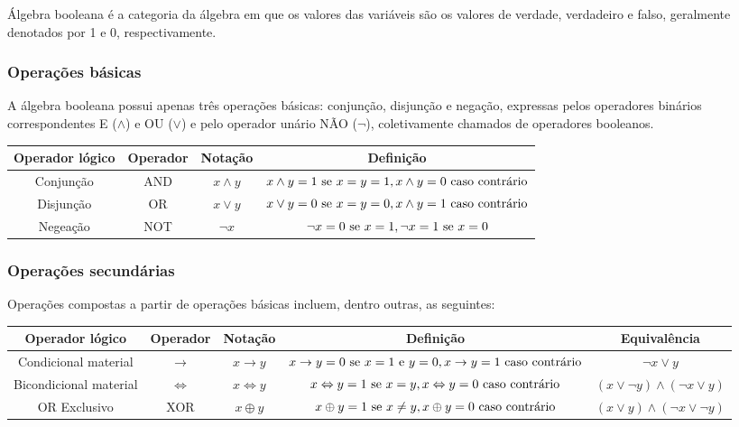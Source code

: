 Álgebra booleana é a categoria da álgebra em que os valores das variáveis são os valores de verdade, verdadeiro e falso, geralmente denotados por 1 e 0, respectivamente.

\subsubsection{Operações básicas}
A álgebra booleana possui apenas três operações básicas: conjunção, disjunção e negação, expressas pelos operadores binários correspondentes E ($\land$) e OU ($\lor$) e pelo operador unário NÃO ($\neg$), coletivamente chamados de operadores booleanos.

\begin{center}
    \begin{tabular}{c|c|c|c}
        Operador lógico & Operador & Notação & Definição\\
        \hline
        Conjunção & AND & $x \land y$  & $x \land y = 1 \textnormal{ se } x=y=1,x \land y = 0 \textnormal{ caso contrário}$ \\
        Disjunção & OR & $x \lor y$ & $x \lor y = 0 \textnormal{ se } x=y=0,x \land y = 1 \textnormal{ caso contrário}$  \\
        Negeação & NOT & $\neg x$ & $\neg x = 0 \textnormal{ se } x=1,\neg x  = 1 \textnormal{ se }x=0$ 
    \end{tabular}
    
\end{center}

\subsubsection{Operações secundárias}
Operações compostas a partir de operações básicas incluem, dentro outras, as seguintes:
\begin{center}
    \begin{tabular}{c|c|c|c|c}
        Operador lógico & Operador & Notação & Definição & Equivalência\\
        \hline
        Condicional material & $\rightarrow$ & $x \rightarrow y$ & $x \rightarrow y = 0 \textnormal{ se } x = 1 \textnormal{ e } y = 0,x \rightarrow y = 1 \textnormal{ caso contrário}$ & $\neg x \lor y$ \\
        Bicondicional material & $\Leftrightarrow$ & $x \Leftrightarrow y$ &$x \Leftrightarrow y = 1 \textnormal{ se } x=y,x \Leftrightarrow y = 0 \textnormal{ caso contrário}$ & $(x \lor \neg y) \land (\neg x \lor y)$\\
        OR Exclusivo & XOR & $x \oplus y$  &$x \oplus y = 1 \textnormal{ se } x\neq y,x \oplus y = 0 \textnormal{ caso contrário}$ & $(x \lor y) \land (\neg x \lor \neg y)$
    \end{tabular}
\end{center}


